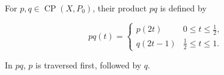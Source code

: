 For $p, q \in \operatorname{CP}(X, P_0)$, their product $pq$ is defined by

$$pq(t) = \begin{cases} p(2t) & 0 \leqslant t \leqslant \frac{1}{2}, \\ q(2t-1) & \frac{1}{2} \leqslant t \leqslant 1. \end{cases}$$

In $pq$, $p$ is traversed first, followed by $q$.
